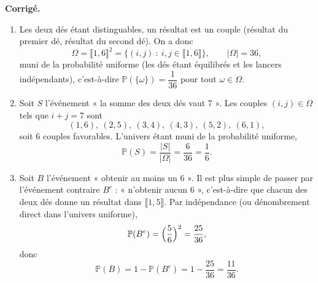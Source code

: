\documentclass[12pt,a4paper]{article}
\newcommand{\intervalle}[2]{\llbracket #1,#2 \rrbracket}
\renewcommand{\P}{\mathbb{P}}
\newenvironment{corrige}{\par\smallskip\noindent\textbf{Corrigé.} }{\par\medskip}
\begin{document}
\begin{corrige}
\begin{enumerate}
\item Les deux dés étant distinguables, un résultat est un couple (résultat du premier dé,
résultat du second dé). On a donc
\[
\Omega=\intervalle{1}{6}^2=\{(i,j)\ :\ i,j\in\intervalle{1}{6}\},\qquad |\Omega|=36,
\]
muni de la probabilité uniforme (les dés étant équilibrés et les lancers indépendants),
c'est-à-dire $\P(\{\omega\})=\dfrac{1}{36}$ pour tout $\omega\in\Omega$.

\item Soit $S$ l'événement « la somme des deux dés vaut 7 ». Les couples $(i,j)\in\Omega$
tels que $i+j=7$ sont
\[
(1,6),\ (2,5),\ (3,4),\ (4,3),\ (5,2),\ (6,1),
\]
soit $6$ couples favorables. L'univers étant muni de la probabilité uniforme,
\[
\P(S)=\frac{|S|}{|\Omega|}=\frac{6}{36}=\frac{1}{6}.
\]

\item Soit $B$ l'événement « obtenir au moins un 6 ». Il est plus simple de passer par
l'événement contraire $B^c$ : « n'obtenir aucun 6 », c'est-à-dire que chacun des deux dés
donne un résultat dans $\intervalle{1}{5}$. Par indépendance (ou dénombrement direct dans
l'univers uniforme),
\[
\P(B^c)=\Bigl(\frac{5}{6}\Bigr)^2=\frac{25}{36},
\]
donc
\[
\P(B)=1-\P(B^c)=1-\frac{25}{36}=\frac{11}{36}.
\]
\end{enumerate}
\end{corrige}
\end{document}
